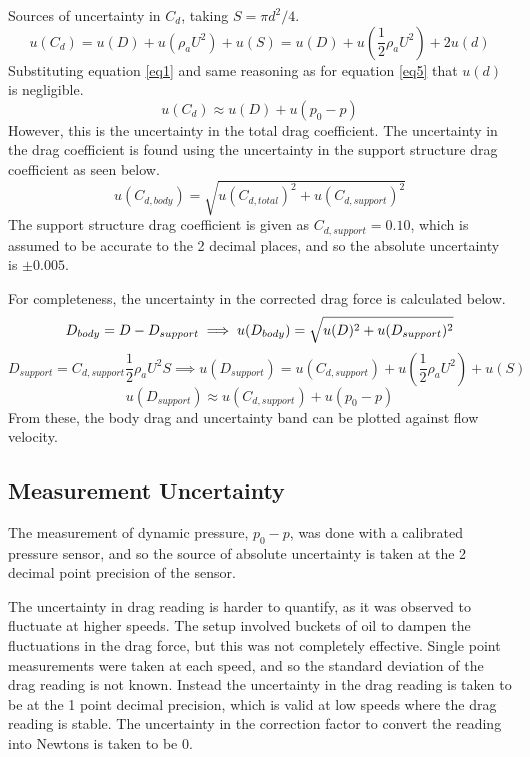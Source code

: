 \documentclass[8pt]{article}
\begin{document}
Sources of uncertainty in $C_d$, taking $S=\pi d^2/4$.
\begin{equation}
    u(C_d) = u(D) + u(\rho_a U^2) + u(S) = u(D) + u \left( \frac{1}{2}\rho_a U^2 \right) + 2u(d)
\end{equation}
Substituting equation \ref{eq1} and same reasoning as for equation \ref{eq5} that $u(d)$ is negligible.
\begin{equation}
    u(C_d) \approx u(D) + u(p_0-p)
\end{equation}
However, this is the uncertainty in the total drag coefficient.
The uncertainty in the drag coefficient is found using the uncertainty in the support structure drag coefficient as seen below.
\begin{equation}
    u(C_{d, body}) = \sqrt{u(C_{d, total})^2 + u(C_{d, support})^2}
\end{equation}
The support structure drag coefficient is given as $C_{d, support} = 0.10$, which is assumed to be accurate to the 2 decimal places, and so the absolute uncertainty is $\pm 0.005$.

For completeness, the uncertainty in the corrected drag force is calculated below.
\begin{equation}
    D_{body} = D - D_{support} \implies u(D_{body} ) = \sqrt{u(D)^2 + u(D_{support})^2} \\
\end{equation}
\begin{equation}
    D_{support} = C_{d, support} \frac{1}{2} \rho_a U^2 S \implies u(D_{support}) = u(C_{d, support}) + u \left( \frac{1}{2}\rho_a U^2 \right) + u(S)
\end{equation}
\begin{equation}
    u(D_{support}) \approx u(C_{d, support}) + u(p_0-p)
\end{equation}
From these, the body drag and uncertainty band can be plotted against flow velocity.

\subsection{Measurement Uncertainty}
The measurement of dynamic pressure, $p_0-p$, was done with a calibrated pressure sensor, and so the source of absolute uncertainty is taken at the 2 decimal point precision of the sensor.

The uncertainty in drag reading is harder to quantify, as it was observed to fluctuate at higher speeds.
The setup involved buckets of oil to dampen the fluctuations in the drag force, but this was not completely effective.
Single point measurements were taken at each speed, and so the standard deviation of the drag reading is not known.
Instead the uncertainty in the drag reading is taken to be at the 1 point decimal precision, which is valid at low speeds where the drag reading is stable.
The uncertainty in the correction factor to convert the reading into Newtons is taken to be 0.
\end{document}
